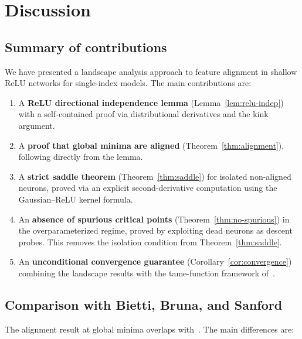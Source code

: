 \documentclass[11pt]{amsart}
\theoremstyle{definition}
\begin{document}
\section{Discussion}\label{sec:discussion}

\subsection{Summary of contributions}

We have presented a landscape analysis approach to feature alignment in shallow ReLU networks for single-index models. The main contributions are:

\begin{enumerate}[label=(\arabic*)]
\item A \textbf{ReLU directional independence lemma} (Lemma~\ref{lem:relu-indep}) with a self-contained proof via distributional derivatives and the kink argument.

\item A \textbf{proof that global minima are aligned} (Theorem~\ref{thm:alignment}), following directly from the lemma.

\item A \textbf{strict saddle theorem} (Theorem~\ref{thm:saddle}) for isolated non-aligned neurons, proved via an explicit second-derivative computation using the Gaussian--ReLU kernel formula.

\item An \textbf{absence of spurious critical points} (Theorem~\ref{thm:no-spurious}) in the overparameterized regime, proved by exploiting dead neurons as descent probes.  This removes the isolation condition from Theorem~\ref{thm:saddle}.

\item An \textbf{unconditional convergence guarantee} (Corollary~\ref{cor:convergence}) combining the landscape results with the tame-function framework of~\cite{davis2020}.
\end{enumerate}

\subsection{Comparison with Bietti, Bruna, and Sanford~\cite{bietti2022}}

The alignment result at global minima overlaps with~\cite{bietti2022}. The main differences are:
\end{document}
